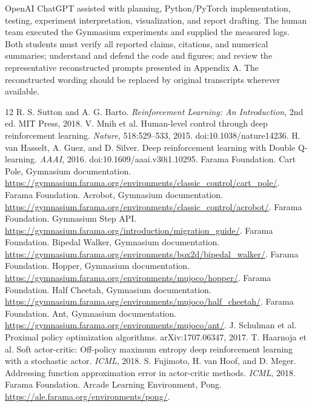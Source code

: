 \documentclass[a4paper,10pt,twocolumn]{article}
\begin{document}
OpenAI ChatGPT assisted with planning, Python/PyTorch implementation, testing, experiment interpretation, visualization, and report drafting. The human team executed the Gymnasium experiments and supplied the measured logs. Both students must verify all reported claims, citations, and numerical summaries; understand and defend the code and figures; and review the representative reconstructed prompts presented in Appendix A. The reconstructed wording should be replaced by original transcripts wherever available.

\begin{thebibliography}{12}\footnotesize
{} R. S. Sutton and A. G. Barto. \emph{Reinforcement Learning: An Introduction}, 2nd ed. MIT Press, 2018.
 V. Mnih et al. Human-level control through deep reinforcement learning. \emph{Nature}, 518:529--533, 2015. doi:10.1038/nature14236.
 H. van Hasselt, A. Guez, and D. Silver. Deep reinforcement learning with Double Q-learning. \emph{AAAI}, 2016. doi:10.1609/aaai.v30i1.10295.
 Farama Foundation. Cart Pole, Gymnasium documentation. \url{https://gymnasium.farama.org/environments/classic_control/cart_pole/}.
 Farama Foundation. Acrobot, Gymnasium documentation. \url{https://gymnasium.farama.org/environments/classic_control/acrobot/}.
 Farama Foundation. Gymnasium Step API. \url{https://gymnasium.farama.org/introduction/migration_guide/}.
 Farama Foundation. Bipedal Walker, Gymnasium documentation. \url{https://gymnasium.farama.org/environments/box2d/bipedal_walker/}.
 Farama Foundation. Hopper, Gymnasium documentation. \url{https://gymnasium.farama.org/environments/mujoco/hopper/}.
 Farama Foundation. Half Cheetah, Gymnasium documentation. \url{https://gymnasium.farama.org/environments/mujoco/half_cheetah/}.
 Farama Foundation. Ant, Gymnasium documentation. \url{https://gymnasium.farama.org/environments/mujoco/ant/}.
 J. Schulman et al. Proximal policy optimization algorithms. arXiv:1707.06347, 2017.
 T. Haarnoja et al. Soft actor-critic: Off-policy maximum entropy deep reinforcement learning with a stochastic actor. \emph{ICML}, 2018.
 S. Fujimoto, H. van Hoof, and D. Meger. Addressing function approximation error in actor-critic methods. \emph{ICML}, 2018.
 Farama Foundation. Arcade Learning Environment, Pong. \url{https://ale.farama.org/environments/pong/}.
\end{thebibliography}
\end{document}

